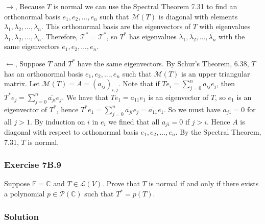 $\rightarrow$, Because $T$ is normal we can use the Spectral Theorem 7.31 to find an orthonormal basis $e_1, e_2, ..., e_n$ such that $\mathcal{M}(T)$ is diagonal with elements $\lambda_1, \lambda_2, ..., \lambda_n$.
This orthonormal basis are the eigenvectors of $T$ with eigenvalues $\lambda_1, \lambda_2, ..., \lambda_n$.
Therefore, $\mathcal{T^*} = \mathcal{T}^*$, so $T^*$ has eigenvalues $\overline{\lambda_1}, \overline{\lambda_2}, ..., \overline{\lambda_n}$ with the same eigenvectors $e_1, e_2, ..., e_n$.

\noindent $\leftarrow$, Suppose $T$ and $T^*$ have the same eigenvectors.
By Schur's Theorem, 6.38, $T$ has an orthonormal basis $e_1, e_2, ..., e_n$ such that $\mathcal{M}(T)$ is an upper triangular matrix.
Let $\mathcal{M}(T) = A = (a_{ij})_{i,j}$.
Note that if $Te_i = \sum_{j=0}^n a_{ij} e_j$, then $T^*e_j = \sum_{j = 0}^n \overline{a_{ji}} e_j$.
We have that $Te_1 = a_{11} e_1$ is an eigenvector of $T$, so $e_1$ is an eigenvector of $T^*$, hence $T^*e_1 = \sum_{j = 0}^n \overline{a_{ji}} e_j = \overline{a_{11}} e_1$.
So we must have $a_{j1} = 0$ for all $j > 1$.
By induction on $i$ in $e_i$ we fined that all $a_{ji} = 0$ if $j > i$.
Hence $A$ is diagonal with respect to orthonormal basis $e_1, e_2, ..., e_n$.
By the Spectral Theorem, 7.31, $T$ is normal.


\subsubsection*{Exercise 7B.9}

Suppose $\mathbb{F} = \mathbb{C}$ and $T \in \mathcal{L}(V)$.
Prove that $T$ is normal if and only if there exists a polynomial $p \in \mathcal{P}(\mathbb{C})$ such that $T^* = p(T)$.

\subsubsection*{Solution}

